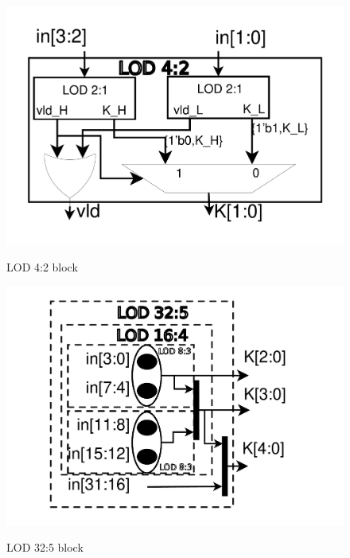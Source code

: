 \begin{figure}[h!]
\begin{minipage}[b]{0.5\linewidth}
        \centering
        \begin{minipage}{0.6\textwidth}
            \includegraphics[width=\textwidth]{figures/lod4_2.pdf}
            \caption{LOD 4:2 block}
            \label{fig:lod42_00001}
        \end{minipage}
        \vfill
        \begin{minipage}{0.6\textwidth}
            \includegraphics[width=\textwidth]{figures/lod32_5.pdf}
            \caption{LOD 32:5 block}
            \label{fig:lod16_4_0000}
        \end{minipage}
        \label{fig:pacogen_LOD_arch}
    \end{minipage}
    \begin{minipage}[b]{0.5\linewidth}

\end{minipage}
\end{figure}
